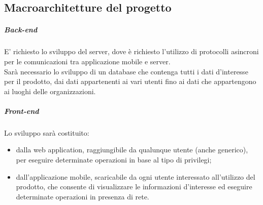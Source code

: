 \documentclass[../analisi-dei-requisiti.tex]{subfiles}
\begin{document}
\subsection{Macroarchitetture del progetto}%
\label{sub:macroarchitetture_del_progetto}
\subparagraph*{Back-end}%
\label{par:back-end}
E' richiesto lo sviluppo  del server, dove è richiesto l'utilizzo di protocolli asincroni per le comunicazioni tra applicazione mobile e server.\\
Sarà necessario lo sviluppo di un database che contenga tutti i dati d'interesse per il prodotto, dai dati appartenenti ai vari utenti fino ai dati che appartengono ai
luoghi delle organizzazioni.

\subparagraph*{Front-end}%
\label{par:front-end}
Lo sviluppo  sarà costituito:
\begin{itemize}
  \item dalla web application, raggiungibile da qualunque utente (anche generico), per eseguire determinate operazioni in base al tipo di privilegi;
  \item dall'applicazione mobile, scaricabile da ogni utente interessato all'utilizzo del prodotto, che consente di visualizzare le informazioni d'interesse ed eseguire determinate
        operazioni in presenza di rete.
\end{itemize}
\end{document}
